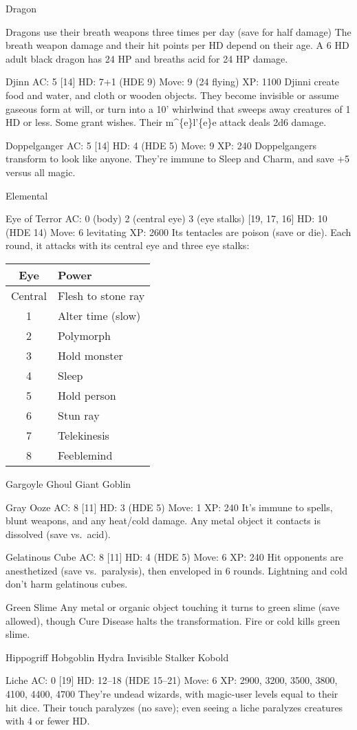 Dragon

Dragons use their breath weapons three times per day (save for half
damage)\hspace{1em} The breath weapon damage and their hit points per HD
depend on their age. A 6 HD adult black dragon has 24 HP and breaths
acid for 24 HP damage.

Djinn AC: 5 {[}14{]} HD: 7+1 (HDE 9) Move: 9 (24 flying) XP: 1100 Djinni
create food and water, and cloth or wooden objects. They become
invisible or assume gaseous form at will, or turn into a 10' whirlwind
that sweeps away creatures of 1 HD or less. Some grant wishes. Their
m\^{}\{e\}l'\{e\}e attack deals 2d6 damage.

Doppelganger AC: 5 {[}14{]} HD: 4 (HDE 5) Move: 9 XP: 240 Doppelgangers
transform to look like anyone. They're immune to Sleep and Charm, and
save +5 versus all magic.

Elemental

Eye of Terror AC: 0 (body) 2 (central eye) 3 (eye stalks) {[}19, 17,
16{]} HD: 10 (HDE 14) Move: 6 levitating XP: 2600 Its tentacles are
poison (save or die). Each round, it attacks with its central eye and
three eye stalks:

\begin{longtable}[]{@{}cl@{}}
\toprule
Eye & Power\tabularnewline
\midrule
\endhead
Central & Flesh to stone ray\tabularnewline
1 & Alter time (slow)\tabularnewline
2 & Polymorph\tabularnewline
3 & Hold monster\tabularnewline
4 & Sleep\tabularnewline
5 & Hold person\tabularnewline
6 & Stun ray\tabularnewline
7 & Telekinesis\tabularnewline
8 & Feeblemind\tabularnewline
\bottomrule
\end{longtable}

Gargoyle Ghoul Giant Goblin

Gray Ooze AC: 8 {[}11{]} HD: 3 (HDE 5) Move: 1 XP: 240 It's immune to
spells, blunt weapons, and any heat/cold damage. Any metal object it
contacts is dissolved (save vs.~acid).

Gelatinous Cube AC: 8 {[}11{]} HD: 4 (HDE 5) Move: 6 XP: 240 Hit
opponents are anesthetized (save vs.~paralysis), then enveloped in 6
rounds. Lightning and cold don't harm gelatinous cubes.

Green Slime Any metal or organic object touching it turns to green slime
(save allowed), though Cure Disease halts the transformation. Fire or
cold kills green slime.

Hippogriff Hobgoblin Hydra Invisible Stalker Kobold

Liche AC: 0 {[}19{]} HD: 12--18 (HDE 15--21) Move: 6 XP: 2900, 3200,
3500, 3800, 4100, 4400, 4700 They're undead wizards, with magic-user
levels equal to their hit dice. Their touch paralyzes (no save); even
seeing a liche paralyzes creatures with 4 or fewer HD.

